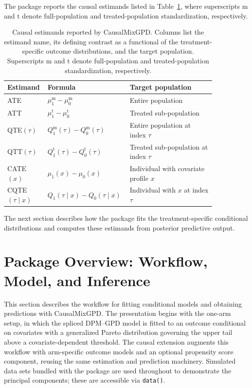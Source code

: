 \documentclass[article]{jss}\usepackage[]{graphicx}\usepackage[]{xcolor}
\DeclareRobustCommand{\pkg}[1]{\textsf{#1}}
\DeclareRobustCommand{\code}[1]{\nolinkurl{#1}}
\begin{document}
The package reports the causal estimands listed in
Table~\ref{tab:causal-estimands-main}, where superscripts
$\mathrm{m}$ and $\mathrm{t}$ denote full-population and
treated-population standardization, respectively.

\begin{table}[H]
\centering
\small
\caption[Causal estimands reported by the package]{Causal estimands reported by \pkg{CausalMixGPD}. Columns list the estimand name, its defining contrast as a functional of the treatment-specific outcome distributions, and the target population. Superscripts $\mathrm{m}$ and $\mathrm{t}$ denote full-population and treated-population standardization, respectively.}
\label{tab:causal-estimands-main}
{
\renewcommand{\arraystretch}{1.15}
\begin{tabular}{
  @{}>{\raggedright\arraybackslash}p{0.15\linewidth}
  >{\centering\arraybackslash}p{0.30\linewidth}
  >{\raggedright\arraybackslash}p{0.40\linewidth}@{}
}
\toprule
Estimand & Formula & Target population \\
\midrule
ATE & $\mu_1^{\mathrm{m}}-\mu_0^{\mathrm{m}}$ & Entire population \\
ATT & $\mu_1^{\mathrm{t}}-\mu_0^{\mathrm{t}}$ & Treated sub-population \\
QTE$(\tau)$ & $Q_1^{\mathrm{m}}(\tau)-Q_0^{\mathrm{m}}(\tau)$ & Entire population at index $\tau$\\
QTT$(\tau)$ & $Q_1^{\mathrm{t}}(\tau)-Q_0^{\mathrm{t}}(\tau)$ & Treated sub-population at index $\tau$\\
CATE$(x)$ & $\mu_1(x)-\mu_0(x)$ & Individual with covariate profile $x$ \\
CQTE$(\tau\mid x)$ & $Q_1(\tau\mid x)-Q_0(\tau\mid x)$ & Individual with $x$ at index $\tau$\\
\bottomrule
\end{tabular}
}
\end{table}

The next section describes how the package fits the treatment-specific
conditional distributions and computes these estimands from posterior
predictive output.


\section{Package Overview: Workflow, Model, and Inference}
\label{sec:overview}

This section describes the workflow for fitting conditional models and
obtaining predictions with \pkg{CausalMixGPD}.  The presentation
begins with the one-arm setup, in which the spliced DPM--GPD model is
fitted to an outcome conditional on covariates with a generalized
Pareto distribution governing the upper tail above a
covariate-dependent threshold.  The causal extension augments this
workflow with arm-specific outcome models and an optional propensity
score component, reusing the same estimation and prediction machinery.
Simulated data sets bundled with the package are used throughout to
demonstrate the principal components; these are accessible via
\code{data()}.
\end{document}
